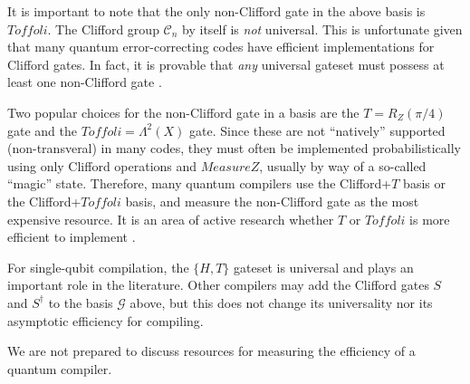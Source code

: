 It is important to note that the only non-Clifford gate in the above basis
is $Toffoli$.
The Clifford group $\mathcal{C}_n$ by itself is \emph{not}
universal.
This is unfortunate given that many quantum error-correcting codes have
efficient implementations for Clifford gates. In fact, it is provable
that \emph{any} universal gateset must possess at least one
non-Clifford gate \cite{Zheng2011}.

Two popular choices for the non-Clifford gate in a basis are the $T = R_Z(\pi/4)$
gate and the $Toffoli = \Lambda^2(X)$ gate. Since these are not ``natively''
supported (non-transveral) in many codes, they must often be implemented
probabilistically using only Clifford operations and $MeasureZ$, usually
by way of a so-called ``magic'' state.
Therefore, many quantum compilers
use the Clifford+$T$ basis or the Clifford+$Toffoli$ basis, and measure
the non-Clifford gate as the most expensive resource. It is an area of
active research
whether $T$ or $Toffoli$ is more efficient to implement
\cite{Jones2012a,Eastin2012}.

For single-qubit compilation, the $\{H,T\}$ gateset is universal and
plays an important role in the literature. Other compilers may add
the Clifford gates $S$ and $S^{\dagger}$ to the basis $\mathcal{G}$ above,
but this does not change its universality nor its asymptotic efficiency for
compiling.

We are not prepared to discuss resources for measuring the efficiency of
a quantum compiler.
